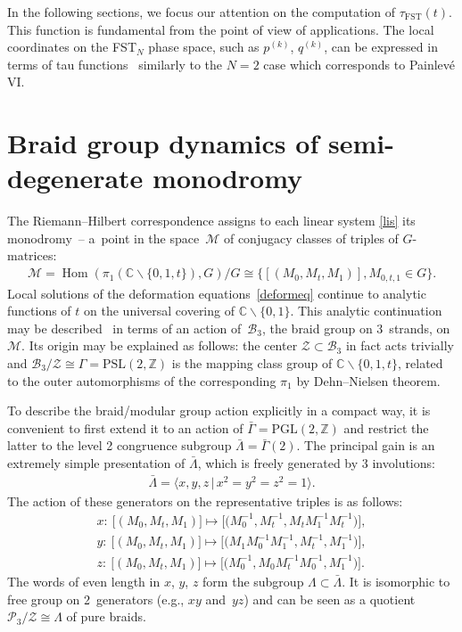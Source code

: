 \documentclass[pdftex]{sigma}
\numberwithin{equation}{section}
\begin{document}
In the following sections, we focus our attention on the computation of $\tau_{\mathrm{FST}}(t)$. This function is fundamental from the point of view of applications. The local coordinates on the FST$_N$ phase space, such as $p^{(k)}$, $q^{(k)}$, can be expressed in terms of tau functions~\cite{Tsuda0,Tsuda} similarly to the $N=2$ case which corresponds to Painlev\'e VI.

\section{Braid group dynamics of semi-degenerate monodromy\label{sec_BG}}
The Riemann--Hilbert correspondence assigns to each linear system \eqref{lis} its monodromy~-- a~point in the space~$\mathcal M$ of conjugacy classes of triples of $G$-matrices:
\begin{gather*}
\mathcal M=\operatorname{Hom}(\pi_1(\mathbb C\backslash \{0,1,t \}),G)/G\cong \big\{ [( M_0,M_t,M_1)], M_{0,t,1}\in G\big\}.
\end{gather*}
Local solutions of the deformation equations~\eqref{deformeq} continue to analytic functions of $t$ on the universal covering of $\mathbb C\backslash \{0,1 \}$. This analytic continuation may be described~\cite{DM} in terms of an action of~$\mathcal B_3$, the braid group on 3~strands, on~$\mathcal M$. Its origin may be explained as follows: the center $\mathcal Z\subset \mathcal B_3$ in fact acts trivially and
$\mathcal B_3/\mathcal Z\cong \Gamma=\mathrm{PSL}(2,\mathbb Z)$ is the mapping class group of $\mathbb C\backslash \{0,1,t \}$, related to the outer automorphisms of the corresponding $\pi_1$ by Dehn--Nielsen theorem.

To describe the braid/modular group action explicitly in a compact way, it is convenient \cite{LT} to first extend it to an action of $\bar\Gamma=\mathrm{PGL}(2,\mathbb Z)$ and restrict the latter to the level 2 congruence subgroup $\bar\Lambda=\bar\Gamma(2)$. The principal gain is an extremely simple presentation of $\bar\Lambda$, which is freely generated by 3 involutions:
\begin{gather*}
\bar{\Lambda}=\big \langle x,y,z\,|\,x^2=y^2=z^2=1\big\rangle.
\end{gather*}
The action of these generators on the representative triples is as follows:
\begin{gather}
x\colon \ \big[(M_0,M_t,M_1)\big]\mapsto\big[\big( M_0^{-1},M_t^{-1},M_t M_1^{-1}M_t^{-1}\big)\big],\nonumber\\
y\colon \ \big[(M_0,M_t,M_1)\big]\mapsto\big[\big( M_1 M_0^{-1}M_1^{-1},M_t^{-1},M_1^{-1}\big)\big],\nonumber\\
z\colon \ \big[(M_0,M_t,M_1)\big]\mapsto\big[\big( M_0^{-1}, M_0 M_t^{-1}M_0^{-1},M_1^{-1}\big)\big] .\label{xyzd}
\end{gather}
The words of even length in $x$, $y$, $z$ form the subgroup $\Lambda\subset\bar\Lambda$. It is isomorphic to free group on 2~generators (e.g., $xy$ and~$yz$) and can be seen as a quotient $\mathcal P_3/\mathcal Z\cong \Lambda$ of pure braids.
\end{document}
